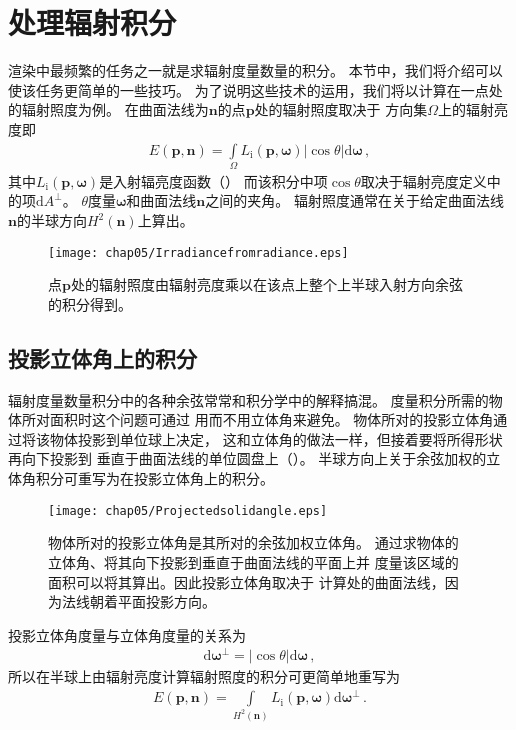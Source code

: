 \section{处理辐射积分}\label{sec:处理辐射积分}

渲染中最频繁的任务之一就是求辐射度量数量的积分。
本节中，我们将介绍可以使该任务更简单的一些技巧。
为了说明这些技术的运用，我们将以计算在一点处的辐射照度为例。
在曲面法线为$\bm n$的点$\bm p$处的辐射照度取决于
方向集$\Omega$上的辐射亮度即
\begin{align}\label{eq:5.4}
    E({\bm p},{\bm n})=\int\limits_{\Omega}{L_{\mathrm{i}}({\bm p},{\bm\omega})|\cos\theta|\mathrm{d}\bm\omega}\, ,
\end{align}
其中$L_{\mathrm{i}}({\bm p},{\bm\omega})$是入射辐亮度函数（）
而该积分中项$\cos\theta$取决于辐射亮度定义中的项$\mathrm{d}A^{\perp}$。
$\theta$度量$\bm\omega$和曲面法线$\bm n$之间的夹角。
辐射照度通常在关于给定曲面法线$\bm n$的半球方向$H^2(\bm n)$上算出。
\begin{figure}[htbp]
    \centering\texttt{[image: chap05/Irradiancefromradiance.eps]}
    \caption{点$\bm p$处的辐射照度由辐射亮度乘以在该点上整个上半球入射方向余弦的积分得到。}
    \label{fig:5.12}
\end{figure}

\subsection{投影立体角上的积分}\label{sub:投影立体角上的积分}
辐射度量数量积分中的各种余弦常常和积分学中的解释搞混。
度量积分所需的物体所对面积时这个问题可通过
用而不用立体角来避免。
物体所对的投影立体角通过将该物体投影到单位球上决定，
这和立体角的做法一样，但接着要将所得形状再向下投影到
垂直于曲面法线的单位圆盘上（）。
半球方向上关于余弦加权的立体角积分可重写为在投影立体角上的积分。
\begin{figure}[htbp]
    \centering\texttt{[image: chap05/Projectedsolidangle.eps]}
    \caption{物体所对的投影立体角是其所对的余弦加权立体角。
        通过求物体的立体角、将其向下投影到垂直于曲面法线的平面上并
        度量该区域的面积可以将其算出。因此投影立体角取决于
        计算处的曲面法线，因为法线朝着平面投影方向。}
    \label{fig:5.13}
\end{figure}

投影立体角度量与立体角度量的关系为
\begin{align*}
    \mathrm{d}{\bm\omega}^{\perp}=|\cos\theta|\mathrm{d}{\bm\omega}\, ,
\end{align*}
所以在半球上由辐射亮度计算辐射照度的积分可更简单地重写为
\begin{align*}
    E({\bm p},{\bm n})=\int\limits_{H^2({\bm n})}{L_{\mathrm{i}}({\bm p},{\bm\omega})\mathrm{d}{\bm\omega}^{\perp}}\, .
\end{align*}

